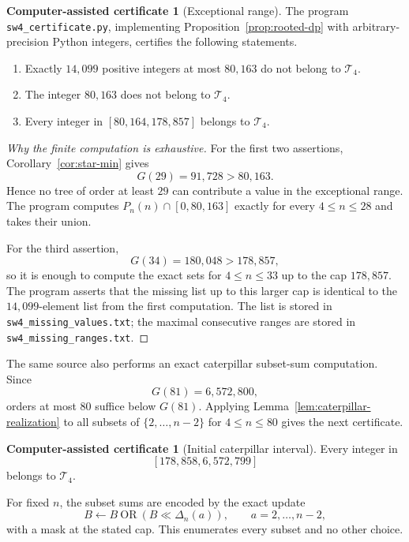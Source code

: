 \documentclass[11pt]{article}
\theoremstyle{definition}
\newtheorem{certificate}[theorem]{Computer-assisted certificate}
\theoremstyle{remark}
\newcommand{\Tfour}{\mathcal T_4}
\newcommand{\interval}[2]{\left[#1,#2\right]}
\newcommand{\code}[1]{\nolinkurl{#1}}
\begin{document}
\begin{certificate}[Exceptional range]\label{cert:exceptions}
The program \code{sw4_certificate.py}, implementing
Proposition~\ref{prop:rooted-dp} with arbitrary-precision Python integers,
certifies the following statements.
\begin{enumerate}[label=(\alph*)]
\item Exactly $14{,}099$ positive integers at most $80{,}163$ do not belong to
      $\Tfour$.
\item The integer $80{,}163$ does not belong to $\Tfour$.
\item Every integer in $\interval{80{,}164}{178{,}857}$ belongs to $\Tfour$.
\end{enumerate}
\end{certificate}

\begin{proof}[Why the finite computation is exhaustive]
For the first two assertions, Corollary~\ref{cor:star-min} gives
\[
  G(29)=91{,}728>80{,}163.
\]
Hence no tree of order at least $29$ can contribute a value in the exceptional
range.  The program computes $P_n(n)\cap[0,80{,}163]$ exactly for every
$4\le n\le28$ and takes their union.

For the third assertion,
\[
  G(34)=180{,}048>178{,}857,
\]
so it is enough to compute the exact sets for $4\le n\le33$ up to the cap
$178{,}857$.  The program asserts that the missing list up to this larger cap
is identical to the $14{,}099$-element list from the first computation.  The
list is stored in \code{sw4_missing_values.txt}; the maximal consecutive
ranges are stored in \code{sw4_missing_ranges.txt}.
\end{proof}

The same source also performs an exact caterpillar subset-sum computation.
Since
\[
  G(81)=6{,}572{,}800,
\]
orders at most $80$ suffice below $G(81)$.  Applying
Lemma~\ref{lem:caterpillar-realization} to all subsets of
$\{2,\ldots,n-2\}$ for $4\le n\le80$ gives the next certificate.

\begin{certificate}[Initial caterpillar interval]\label{cert:initial-cat}
Every integer in
\[
  \interval{178{,}858}{6{,}572{,}799}
\]
belongs to $\Tfour$.
\end{certificate}

For fixed $n$, the subset sums are encoded by the exact update
\[
  B\longleftarrow B\ \mathrm{OR}\ (B\ll\Delta_n(a)),
  \qquad a=2,\ldots,n-2,
\]
with a mask at the stated cap.  This enumerates every subset and no other
choice.
\end{document}
